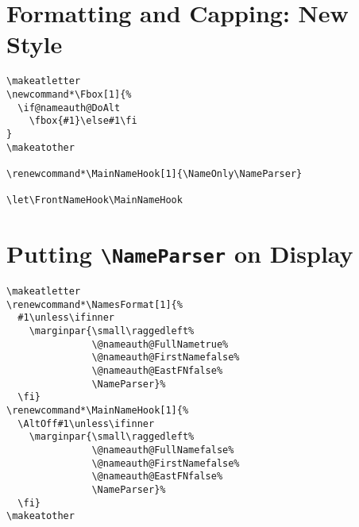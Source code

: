 \documentclass{article}
\begin{document}
\section{Formatting and Capping: New Style}
\begin{verbatim}
\makeatletter
\newcommand*\Fbox[1]{%
  \if@nameauth@DoAlt
    \fbox{#1}\else#1\fi
}
\makeatother

\renewcommand*\MainNameHook[1]{\NameOnly\NameParser}

\let\FrontNameHook\MainNameHook
\end{verbatim}
\clearpage

\section{Putting \texttt{\textbackslash NameParser} on Display}
\begin{verbatim}
\makeatletter
\renewcommand*\NamesFormat[1]{%
  #1\unless\ifinner
    \marginpar{\small\raggedleft%
               \@nameauth@FullNametrue%
               \@nameauth@FirstNamefalse%
               \@nameauth@EastFNfalse%
               \NameParser}%
  \fi}
\renewcommand*\MainNameHook[1]{%
  \AltOff#1\unless\ifinner
    \marginpar{\small\raggedleft%
               \@nameauth@FullNamefalse%
               \@nameauth@FirstNamefalse%
               \@nameauth@EastFNfalse%
               \NameParser}%
  \fi}
\makeatother
\end{verbatim}
\clearpage

\end{document}
